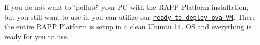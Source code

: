 If you do not want to \char`\"{}pollute\char`\"{} your P\-C with the R\-A\-P\-P Platform installation, but you still want to use it, you can utilize our \href{http://rapp-project.eu/wp-content/uploads/2016/07/rapp-platform-0.6.ova_.tar}{\tt ready-\/to-\/deploy ova V\-M}. There the entire R\-A\-P\-P Platform is setup in a clean Ubuntu 14. O\-S and everything is ready for you to use. 